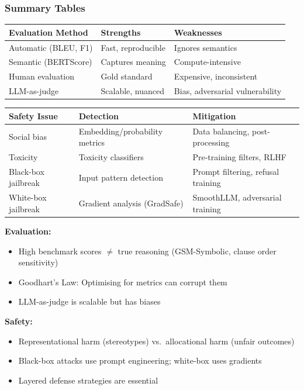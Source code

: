 \bigseparator

\subsubsection{Summary Tables}

\begin{center}
\renewcommand{\arraystretch}{1.3}
\begin{tabular}{@{} l p{5cm} p{4cm} @{}}
\toprule
\textbf{Evaluation Method} & \textbf{Strengths} & \textbf{Weaknesses} \\
\midrule
Automatic (BLEU, F1) & Fast, reproducible & Ignores semantics \\
Semantic (BERTScore) & Captures meaning & Compute-intensive \\
Human evaluation & Gold standard & Expensive, inconsistent \\
LLM-as-judge & Scalable, nuanced & Bias, adversarial vulnerability \\
\bottomrule
\end{tabular}
\end{center}

\vspace{1em}

\begin{center}
\renewcommand{\arraystretch}{1.3}
\begin{tabular}{@{} l p{4cm} p{4cm} @{}}
\toprule
\textbf{Safety Issue} & \textbf{Detection} & \textbf{Mitigation} \\
\midrule
Social bias & Embedding/probability metrics & Data balancing, post-processing \\
Toxicity & Toxicity classifiers & Pre-training filters, RLHF \\
Black-box jailbreak & Input pattern detection & Prompt filtering, refusal training \\
White-box jailbreak & Gradient analysis (GradSafe) & SmoothLLM, adversarial training \\
\bottomrule
\end{tabular}
\end{center}

\begin{thmbox}
\textbf{Evaluation:}
\begin{itemize}
  \item High benchmark scores $\neq$ true reasoning (GSM-Symbolic, clause order sensitivity)
  \item Goodhart's Law: Optimising for metrics can corrupt them
  \item LLM-as-judge is scalable but has biases
\end{itemize}

\textbf{Safety:}
\begin{itemize}
  \item Representational harm (stereotypes) vs.\ allocational harm (unfair outcomes)
  \item Black-box attacks use prompt engineering; white-box uses gradients
  \item Layered defense strategies are essential
\end{itemize}
\end{thmbox}

